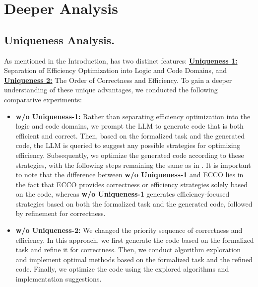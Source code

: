 \section{Deeper Analysis}
\subsection{\tool Uniqueness Analysis.}
As mentioned in the Introduction, \tool has two distinct features: \textbf{\underline{Uniqueness 1:}} Separation of Efficiency Optimization into Logic and Code Domains, and \textbf{\underline{Uniqueness 2:}} The Order of Correctness and Efficiency. 
To gain a deeper understanding of these unique advantages, we conducted the following comparative experiments:
\begin{itemize}[leftmargin=*,itemsep=2pt,topsep=0pt,parsep=0pt]
    \item \textbf{w/o Uniqueness-1:} Rather than separating efficiency optimization into the logic and code domains, we prompt the LLM to generate code that is both efficient and correct. Then, based on the formalized task and the generated code, the LLM is queried to suggest any possible strategies for optimizing efficiency. Subsequently, we optimize the generated code according to these strategies, with the following steps remaining the same as in \tool. It is important to note that the difference between \textbf{w/o Uniqueness-1} and ECCO lies in the fact that ECCO provides correctness or efficiency strategies solely based on the code, whereas \textbf{w/o Uniqueness-1} generates efficiency-focused strategies based on both the formalized task and the generated code, followed by refinement for correctness.
    \item \textbf{w/o Uniqueness-2:} We changed the priority sequence of correctness and efficiency. In this approach, we first generate the code based on the formalized task and refine it for correctness. Then, we conduct algorithm exploration and implement optimal methods based on the formalized task and the refined code. Finally, we optimize the code using the explored algorithms and implementation suggestions.
\end{itemize}
